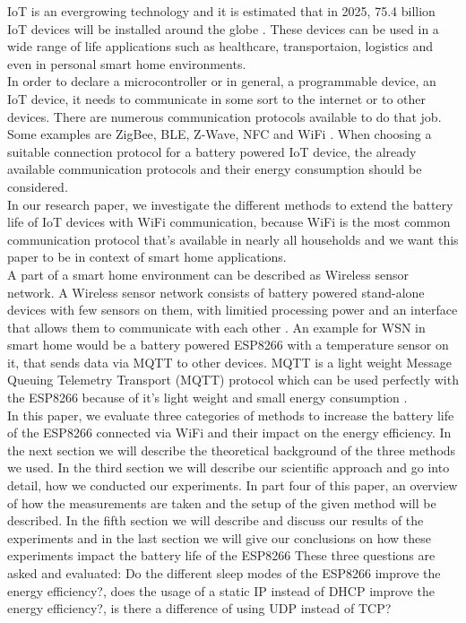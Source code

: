 IoT is an evergrowing technology and it is estimated that in 2025, 75.4 billion IoT devices will be installed around the globe \cite{lucero2016iot}. These devices can be used in a wide range of life applications such as healthcare, transportaion, logistics and even in personal smart home environments.\\  
In order to declare a microcontroller or in general, a programmable device, an IoT device, it needs to communicate in some sort to the internet or to other devices. There are numerous communication protocols available to do that job. Some examples are ZigBee, BLE, Z-Wave, NFC and WiFi \cite{8079928}. 
When choosing a suitable connection protocol for a battery powered IoT device, the already available communication protocols and their energy consumption should be considered.\\
In our research paper, we investigate the different methods to extend the battery life of IoT devices with WiFi communication, because WiFi is the most common communication protocol that's available in nearly all households and we want this paper to be in context of smart home applications.\\
A part of a smart home environment can be described as Wireless sensor network. A Wireless sensor network consists of battery powered stand-alone devices with few sensors on them, with limitied processing power and an interface that allows them to communicate with each other \cite{wsn}. 
An example for WSN in smart home would be a battery powered ESP8266 with a temperature sensor on it, that sends data via MQTT to other devices.
MQTT is a light weight Message Queuing Telemetry Transport (MQTT) protocol which can be used perfectly with the ESP8266 because of it's light weight and small energy consumption \cite{kodali_mqtt_2016}.\\
In this paper, we evaluate three categories of methods to increase the battery life of the ESP8266 connected via WiFi and their impact on the energy efficiency.
In the next section we will describe the theoretical background of the three methods we used. 
In the third section we will describe our scientific approach and go into detail, how we conducted our experiments.
In part four of this paper, an overview of how the measurements are taken and the setup of the given method will be described.
In the fifth section we will describe and discuss our results of the experiments and in the last section we will give our conclusions on how these experiments impact the battery life of the ESP8266
These three questions are asked and evaluated: Do the different sleep modes of the ESP8266 improve the energy efficiency?, does the usage of a static IP instead of DHCP improve the energy efficiency?, is there a difference of using UDP instead of TCP?
